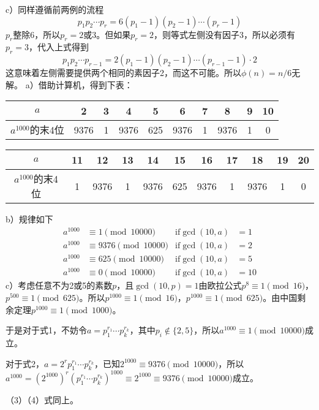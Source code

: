 c）同样遵循前两例的流程
\[p_1p_2\cdots p_r=6(p_1-1)(p_2-1)\cdots(p_r-1)\]
$p_r$整除6，所以$p_r=2$或$3$。但如果$p_r=2$，则等式左侧没有因子3，所以必须有$p_r=3$，代入上式得到
\[p_1p_2\cdots p_{r-1}=2(p_1-1)(p_2-1)\cdots(p_{r-1}-1)\cdot 2\]
这意味着左侧需要提供两个相同的素因子2，而这不可能。所以$\phi(n)=n/6$无解。
%
\exercise a）借助计算机，得到下表：
\begin{center}
\begin{tabular}{c|*{9}{c}}
$a$ & 2 & 3 & 4 & 5 & 6 & 7 & 8 & 9 & 10\\
\hline
$a^{1000}$的末4位 & 9376 & 1 & 9376 & 625 & 9376 & 1 & 9376 & 1 & 0\\
\end{tabular}
\end{center}
\begin{center}
\begin{tabular}{c|*{10}{c}}
$a$ & 11 & 12 & 13 & 14 & 15 & 16 & 17 & 18 & 19 & 20\\
\hline
$a^{1000}$的末4位 & 1 & 9376 & 1 & 9376 & 625 & 9376 & 1 & 9376 & 1 & 0\\
\end{tabular}
\end{center}
b）规律如下
\begin{align*}
a^{1000}&\equiv 1\pmod{10000}&\text{if}\gcd(10,a)&=1 \\
a^{1000}&\equiv 9376\pmod{10000}&\text{if}\gcd(10,a)&=2 \\
a^{1000}&\equiv 625\pmod{10000}&\text{if}\gcd(10,a)&=5 \\
a^{1000}&\equiv 0\pmod{10000}&\text{if}\gcd(10,a)&=10
\end{align*}
c）考虑任意不为2或5的素数$p$，且$\gcd(10,p)=1$由欧拉公式$p^8\equiv1\pmod{16}$，$p^{500}\equiv1\pmod{625}$。所以$p^{1000}\equiv1\pmod{16}$，$p^{1000}\equiv1\pmod{625}$。由中国剩余定理$p^{1000}\equiv1\pmod{1000}$。\par
于是对于式1，不妨令$a=p_1^{r_1}\cdots p_k^{r_k}$，其中$p_i\not\in\{2,5\}$，所以$a^{1000}\equiv 1\pmod{10000}$成立。\par
对于式2，$a=2^rp_1^{r_1}\cdots p_k^{r_k}$，已知$2^{1000}\equiv9376\pmod{10000}$，所以$a^{1000}=(2^{1000})^r(p_1^{r_1}\cdots p_k^{r_k})^{1000}\equiv 2^{1000}\equiv9376\pmod{10000}$成立。\par
（3）（4）式同上。